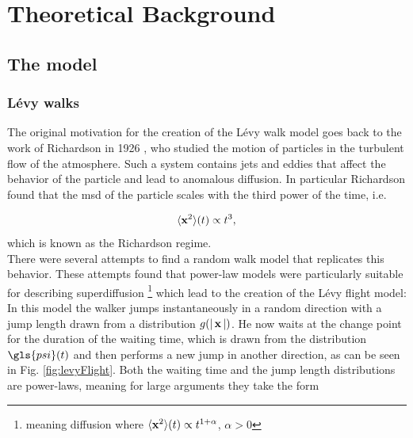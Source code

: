 \chapter{Theoretical Background}

\section{The model}

\subsection{L\'evy walks}

The original motivation for the creation of the L\'evy walk model goes back to the work of Richardson in 1926 \cite{richardson}, who studied the motion of particles in the turbulent flow of the atmosphere. Such a system contains jets and eddies that affect the behavior of the particle and lead to anomalous diffusion. In particular Richardson found that the \gls{msd} of the particle scales with the third power of the time, i.e.

\begin{align}
\langle \mathbf{ x }^2 \rangle(t) \propto t^3 ,
\end{align}
%
which is known as the Richardson regime.\\

There were several attempts to find a random walk model that replicates this behavior. These attempts found that power-law models were particularly suitable for describing superdiffusion \footnote{meaning diffusion where $\langle \mathbf{ x }^2 \rangle(t) \propto t^{1+\alpha}$, $\alpha>0$} which lead to the creation of the L\'evy flight model: In this model the walker jumps instantaneously in a random direction with a jump length drawn from a distribution $g(\left|\,\mathbf{ x }\,\right|)$. He now waits at the change point for the duration of the waiting time, which is drawn from the distribution $\gls{psi}(t)$ and then performs a new jump in another direction, as can be seen in Fig. \ref{fig:levyFlight}. Both the waiting time and the jump length distributions are power-laws, meaning for large arguments they take the form 

